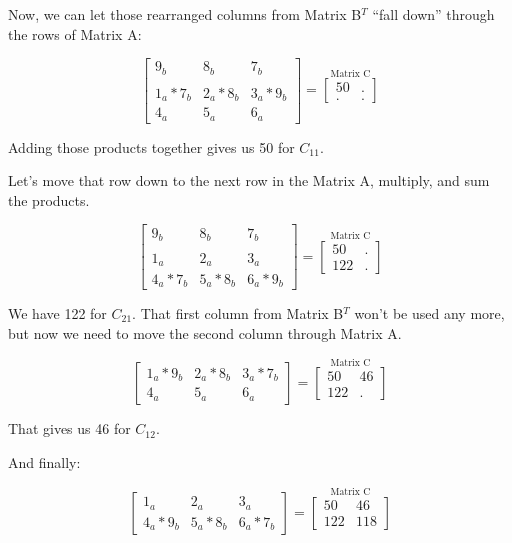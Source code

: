 \documentclass[
  letterpaper,
]{krantz}
\begin{document}
Now, we can let those rearranged columns from Matrix B\(^T\) ``fall
down'' through the rows of Matrix A:

\[
\begin{bmatrix}
9_{b} & 8_{b} & 7_{b} \\
\\
1_{a}*7_{b} & 2_{a}*8_{b} & 3_{a}*9_{b}\\
4_{a} & 5_{a} & 6_{a}
\end{bmatrix}
= 
\stackrel{\mbox{Matrix C}}{
\begin{bmatrix}
50 & .\\
. & .
\end{bmatrix}
}
\]

Adding those products together gives us 50 for \(C_{11}\).

Let's move that row down to the next row in the Matrix A, multiply, and
sum the products.

\[
\begin{bmatrix}
9_{b} & 8_{b} & 7_{b} \\
\\
1_{a} & 2_{a} & 3_{a}\\
4_{a}*7_{b} & 5_{a}*8_{b} & 6_{a}*9_{b}
\end{bmatrix}
= 
\stackrel{\mbox{Matrix C}}{
\begin{bmatrix}
50 & .\\
122 & .
\end{bmatrix}
}
\]

We have 122 for \(C_{21}\). That first column from Matrix B\(^T\) won't
be used any more, but now we need to move the second column through
Matrix A.

\[
\begin{bmatrix}
1_{a}*9_{b} & 2_{a}*8_{b} & 3_{a}*7_{b}\\
4_{a} & 5_{a} & 6_{a}
\end{bmatrix}
= 
\stackrel{\mbox{Matrix C}}{
\begin{bmatrix}
50 & 46\\
122 & .
\end{bmatrix}
}
\]

That gives us 46 for \(C_{12}\).

And finally:

\[
\begin{bmatrix}
1_{a} & 2_{a} & 3_{a}\\
4_{a}*9_{b} & 5_{a}*8_{b} & 6_{a}*7_{b}
\end{bmatrix}
=
\stackrel{\mbox{Matrix C}}{
\begin{bmatrix}
50 & 46\\
122 & 118
\end{bmatrix}
}
\]
\end{document}
